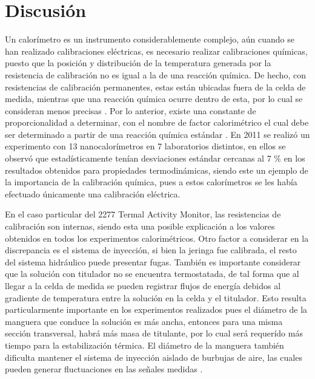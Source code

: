 \newpage

\section{Discusión}\label{sec: discusion}
	Un calor\'imetro es un instrumento considerablemente complejo, a\'un cuando se han realizado calibraciones el\'ectricas, es necesario realizar calibraciones qu\'imicas, puesto que la posici\'on y distribuci\'on de la temperatura generada por la resistencia de calibraci\'on no es igual a la de una reacci\'on qu\'imica. De hecho, con resistencias de calibraci\'on permanentes, estas est\'an ubicadas fuera de la celda de medida, mientras que una reacci\'on qu\'imica ocurre dentro de esta, por lo cual se consideran menos precisas \cite{briggner1991test}. Por lo anterior, existe una constante de proporcionalidad a determinar, con el nombre de factor calorim\'etrico el cual debe ser determinado a partir de una reacci\'on qu\'imica est\'andar \cite{demarse2011calibration}. En 2011 se realiz\'o un experimento con 13 nanocalor\'imetros en 7 laboratorios distintos, en ellos se observ\'o que estad\'isticamente ten\'ian desviaciones est\'andar cercanas al 7 \% en los resultados obtenidos para propiedades termodin\'amicas, siendo este un ejemplo de la importancia de la calibraci\'on qu\'imica, pues a estos calor\'imetros se les hab\'ia efectuado \'unicamente una calibraci\'on el\'ectrica.
	
	En el caso particular del 2277 Termal Activity Monitor, las resistencias de calibraci\'on son internas, siendo esta una posible explicaci\'on a los valores obtenidos en todos los experimentos calorim\'etricos. Otro factor a considerar en la discrepancia es el sistema de inyecci\'on, si bien la jeringa fue calibrada, el resto del sistema hidr\'aulico puede presentar fugas. Tambi\'en es importante considerar que la soluci\'on con titulador no se encuentra termostatada, de tal forma que al llegar a la celda de medida se pueden registrar flujos de energ\'ia debidos al gradiente de temperatura entre la soluci\'on en la celda y el titulador. Esto resulta particularmente importante en los experimentos realizados pues el di\'ametro de la manguera que conduce la soluci\'on es m\'as ancha, entonces para una misma secci\'on transversal, habr\'a m\'as masa de titulante, por lo cual ser\'a requer\'ido m\'as tiempo para la estabilizaci\'on t\'ermica. El di\'ametro de la manguera tambi\'en dificulta mantener el sistema de inyecci\'on aislado de burbujas de aire, las cuales pueden generar fluctuaciones en las se\~nales medidas \cite{duff2011isothermal}.
	\newpage
	
